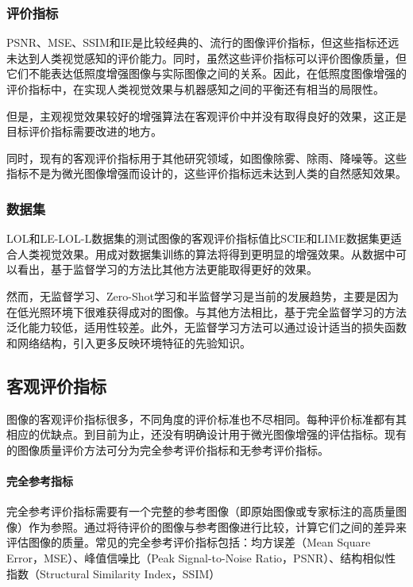 \documentclass[letterpaper,12pt]{article}
\begin{document}
			\subsubsection{评价指标}
			
			PSNR、MSE、SSIM和IE是比较经典的、流行的图像评价指标，但这些指标还远未达到人类视觉感知的评价能力。同时，虽然这些评价指标可以评价图像质量，但它们不能表达低照度增强图像与实际图像之间的关系。因此，在低照度图像增强的评价指标中，在实现人类视觉效果与机器感知之间的平衡还有相当的局限性。
			
			但是，主观视觉效果较好的增强算法在客观评价中并没有取得良好的效果，这正是目标评价指标需要改进的地方。
			
			同时，现有的客观评价指标用于其他研究领域，如图像除雾、除雨、降噪等。这些指标不是为微光图像增强而设计的，这些评价指标远未达到人类的自然感知效果。
			
			\subsubsection{数据集}
			
			LOL和LE-LOL-L数据集的测试图像的客观评价指标值比SCIE和LIME数据集更适合人类视觉效果。用成对数据集训练的算法将得到更明显的增强效果。从数据中可以看出，基于监督学习的方法比其他方法更能取得更好的效果。
			
			然而，无监督学习、Zero-Shot学习和半监督学习是当前的发展趋势，主要是因为在低光照环境下很难获得成对的图像。与其他方法相比，基于完全监督学习的方法泛化能力较低，适用性较差。此外，无监督学习方法可以通过设计适当的损失函数和网络结构，引入更多反映环境特征的先验知识。
			
			
	
		\subsection{客观评价指标}
		
		图像的客观评价指标很多，不同角度的评价标准也不尽相同。每种评价标准都有其相应的优缺点。到目前为止，还没有明确设计用于微光图像增强的评估指标。现有的图像质量评价方法可分为完全参考评价指标和无参考评价指标。
	
			\paragraph{完全参考指标}
			
			完全参考评价指标需要有一个完整的参考图像（即原始图像或专家标注的高质量图像）作为参照。通过将待评价的图像与参考图像进行比较，计算它们之间的差异来评估图像的质量。常见的完全参考评价指标包括：均方误差（Mean Square Error，MSE）、峰值信噪比（Peak Signal-to-Noise Ratio，PSNR）、结构相似性指数（Structural Similarity Index，SSIM）
			
\end{document}
